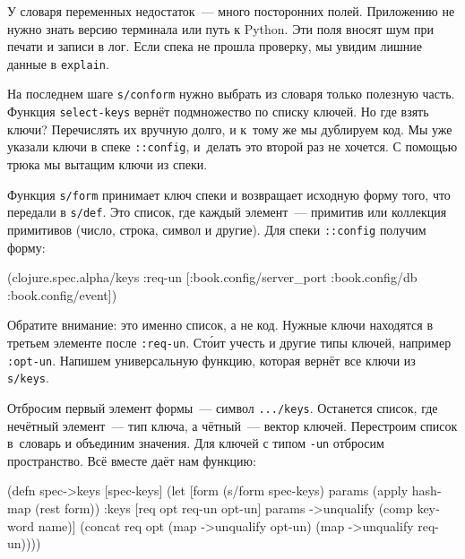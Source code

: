У словаря переменных недостаток~--- много посторонних полей. Приложению не нужно
знать версию терминала или путь к Python. Эти поля вносят шум при печати и
записи в лог. Если спека не прошла проверку, мы увидим лишние данные в
\verb|explain|.


На последнем шаге \verb|s/conform| нужно выбрать из словаря только полезную
часть. Функция \verb|select-keys| вернёт подмножество по списку ключей. Но где
взять ключи? Перечислять их вручную долго, и к~тому же мы дублируем код. Мы уже
указали ключи в спеке \verb|::config|, и~делать это второй раз не хочется. С
помощью трюка мы вытащим ключи из спеки.

Функция \verb|s/form| принимает ключ спеки и возвращает исходную форму того, что
передали в \verb|s/def|. Это список, где каждый элемент~--- примитив или
коллекция примитивов (число, строка, символ и другие). Для спеки \verb|::config|
получим форму:

\begin{english}
  \begin{clojure}
(clojure.spec.alpha/keys
 :req-un [:book.config/server_port
          :book.config/db
          :book.config/event])
  \end{clojure}
\end{english}


Обратите внимание: это именно список, а не код. Нужные ключи находятся в третьем
элементе после \verb|:req-un|. Ст\'{о}ит учесть и другие типы ключей, например
\verb|:opt-un|. Напишем универсальную функцию, которая вернёт все ключи из
\verb|s/keys|.

Отбросим первый элемент формы~--- символ \verb|.../keys|. Останется список, где
нечётный элемент~--- тип ключа, а чётный~--- вектор ключей. Перестроим список
в~словарь и объединим значения. Для ключей с типом \verb|-un| отбросим
пространство. Всё вместе даёт нам функцию:


\ifnarrow

\begin{english}
  \begin{clojure}
(defn spec->keys
  [spec-keys]
  (let [form (s/form spec-keys)
        params (apply hash-map
                 (rest form))
        {:keys [req opt req-un opt-un]}
        params
        ->unqualify (comp keyword name)]
    (concat req
            opt
            (map ->unqualify opt-un)
            (map ->unqualify req-un))))
  \end{clojure}
\end{english}

